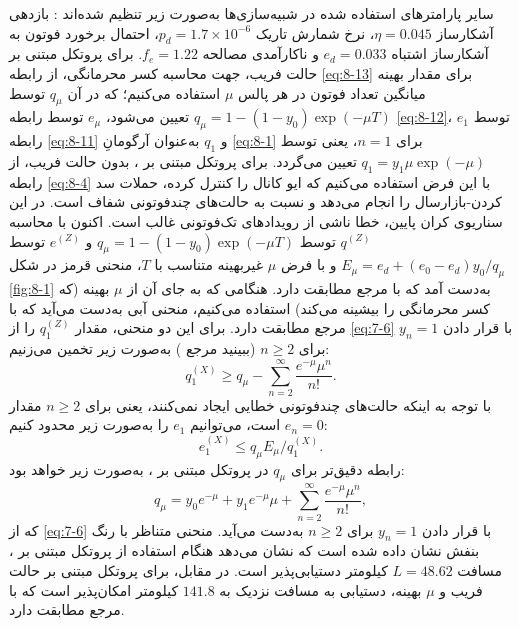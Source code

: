 سایر پارامترهای استفاده شده در شبیه‌سازی‌ها به‌صورت زیر تنظیم شده‌اند \cite{8-10, 8-22, 8-23, 8-24}: بازدهی آشکارساز $\eta = 0.045$، نرخ شمارش تاریک $p_d = 1.7 \times 10^{-6}$، احتمال برخورد فوتون به آشکارساز اشتباه $e_d = 0.033$ و ناکارآمدی مصالحه $f_e = 1.22$. برای پروتکل  مبتنی بر حالت فریب، جهت محاسبه کسر محرمانگی، از رابطه \eqref{eq:8-13} برای مقدار بهینه میانگین تعداد فوتون در هر پالس $\mu$ استفاده می‌کنیم؛ که در آن $q_\mu$ توسط $q_\mu = 1 - (1-y_0)\exp(-\mu T)$ تعیین می‌شود، $e_\mu$ توسط رابطه \eqref{eq:8-12}، $e_1$ توسط رابطه \eqref{eq:8-11} و $q_1$ به‌عنوان آرگومانِ \eqref{eq:8-1} برای $n=1$، یعنی توسط $q_1 = y_1 \mu \exp(-\mu)$ تعیین می‌گردد. برای پروتکل  مبتنی بر ، بدون حالت فریب، از رابطه \eqref{eq:8-4} با این فرض استفاده می‌کنیم که ایو کانال را کنترل کرده، حملات سد کردن-بازارسال را انجام می‌دهد و نسبت به حالت‌های چندفوتونی شفاف است. در این سناریوی کران پایین، خطا ناشی از رویدادهای تک‌فوتونی غالب است. اکنون با محاسبه $q^{(Z)}$ توسط $q_\mu = 1 - (1-y_0)\exp(-\mu T)$ و $e^{(Z)}$ توسط $E_\mu = e_d + (e_0 - e_d)y_0 / q_\mu$ و با فرض $\mu$ غیربهینه متناسب با $T$، منحنی قرمز در شکل \ref{fig:8-1} به‌دست آمد که با مرجع \cite{8-10} مطابقت دارد. هنگامی که به جای آن از $\mu$ بهینه (که کسر محرمانگی را بیشینه می‌کند) استفاده می‌کنیم، منحنی آبی به‌دست می‌آید که با مرجع \cite{8-23} مطابقت دارد. برای این دو منحنی، مقدار $q_1^{(Z)}$ را از \eqref{eq:7-6} با قرار دادن $y_n = 1$ برای $n \geq 2$ (ببینید مرجع \cite{8-22}) به‌صورت زیر تخمین می‌زنیم:
\begin{equation}
	q_1^{(X)} \geq q_\mu - \sum_{n=2}^{\infty} \frac{e^{-\mu} \mu^n}{n!}.
	\label{eq:8-14}
\end{equation}
با توجه به اینکه حالت‌های چندفوتونی خطایی ایجاد نمی‌کنند، یعنی برای $n \geq 2$ مقدار $e_n = 0$ است، می‌توانیم $e_1$ را به‌صورت زیر محدود کنیم:
\begin{equation}
	e_1^{(X)} \leq q_\mu E_\mu / q_1^{(X)}.
	\label{eq:8-15}
\end{equation}
رابطه دقیق‌تر برای $q_\mu$ در پروتکل  مبتنی بر ، به‌صورت زیر خواهد بود:
\begin{equation}
	q_\mu = y_0 e^{-\mu} + y_1 e^{-\mu} \mu + \sum_{n=2}^{\infty} \frac{e^{-\mu} \mu^n}{n!},
	\label{eq:8-16}
\end{equation}
که از \eqref{eq:7-6} با قرار دادن $y_n = 1$ برای $n \geq 2$ به‌دست می‌آید. منحنی متناظر با رنگ بنفش نشان داده شده است که نشان می‌دهد هنگام استفاده از پروتکل  مبتنی بر ، مسافت $L = 48.62$ کیلومتر دستیابی‌پذیر است. در مقابل، برای پروتکل  مبتنی بر حالت فریب و $\mu$ بهینه، دستیابی به مسافت نزدیک به $141.8$ کیلومتر امکان‌پذیر است که با مرجع \cite{8-23} مطابقت دارد.






